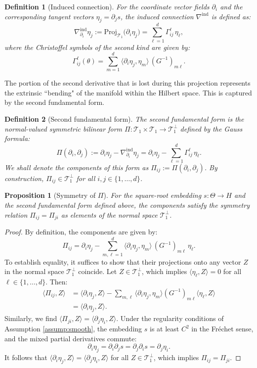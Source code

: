 \documentclass[pdflatex,sn-mathphys-num]{sn-jnl}%
\newcommand{\ip}[2]{\langle #1,#2\rangle}
\theoremstyle{thmstyleone}%
\newtheorem{proposition}[theorem]{Proposition}%
\theoremstyle{thmstyletwo}%
\theoremstyle{thmstylethree}%
\newtheorem{definition}{Definition}%
\begin{document}
\begin{definition}[Induced connection]
For the coordinate vector fields $\partial_i$ and the corresponding tangent vectors $\eta_j = \partial_j s$, the induced connection $\nabla^{\mathrm{ind}}$ is defined as:
\[
\nabla^{\mathrm{ind}}_{\partial_i}\eta_j := \mathrm{Proj}_{\mathcal{T}_1}\big(\partial_i\eta_j\big)
= \sum_{\ell=1}^d \Gamma^\ell_{ij}\,\eta_\ell,
\]
where the Christoffel symbols of the second kind are given by:
\[
\Gamma^\ell_{ij}(\theta) = \sum_{m=1}^d \ip{\partial_i\eta_j}{\eta_m}\,(G^{-1})_{m\ell}.
\]
\end{definition}


The portion of the second derivative that is lost during this projection represents the extrinsic ``bending" of the manifold within the Hilbert space. This is captured by the second fundamental form.

\begin{definition}[Second fundamental form]
The second fundamental form is the normal-valued symmetric bilinear form $\Pi: \mathcal{T}_1 \times \mathcal{T}_1 \to \mathcal{T}_1^\perp$ defined by the Gauss formula:
\[
\Pi(\partial_i,\partial_j) := \partial_i\eta_j - \nabla^{\mathrm{ind}}_{\partial_i}\eta_j = \partial_i\eta_j - \sum_{\ell=1}^d \Gamma^\ell_{ij}\,\eta_\ell.
\]
We shall denote the components of this form as $\Pi_{ij} := \Pi(\partial_i, \partial_j)$. By construction, $\Pi_{ij} \in \mathcal{T}_1^\perp$ for all $i, j \in \{1, \dots, d\}$.
\end{definition}

\begin{proposition}[Symmetry of $\Pi$]
For the square-root embedding $s:\Theta\to H$ and the second fundamental form defined above, the components satisfy the symmetry relation $\Pi_{ij} = \Pi_{ji}$ as elements of the normal space $\mathcal{T}_1^\perp$.
\end{proposition}

\begin{proof}
By definition, the components are given by:
\[
\Pi_{ij} = \partial_i\eta_j - \sum_{m,\ell=1}^d \ip{\partial_i\eta_j}{\eta_m}\,(G^{-1})_{m\ell}\,\eta_\ell.
\]
To establish equality, it suffices to show that their projections onto any vector $Z$ in the normal space $\mathcal{T}_1^\perp$ coincide. Let $Z \in \mathcal{T}_1^\perp$, which implies $\ip{\eta_\ell}{Z} = 0$ for all $\ell \in \{1, \dots, d\}$. Then:
\begin{align*}
\ip{\Pi_{ij}}{Z} &= \ip{\partial_i\eta_j}{Z} - \sum_{m,\ell} \ip{\partial_i\eta_j}{\eta_m} (G^{-1})_{m\ell} \ip{\eta_\ell}{Z} \\
&= \ip{\partial_i\eta_j}{Z}.
\end{align*}
Similarly, we find $\ip{\Pi_{ji}}{Z} = \ip{\partial_j\eta_i}{Z}$. Under the regularity conditions of Assumption \ref{assump:smooth}, the embedding $s$ is at least $C^2$ in the Fr\'echet sense, and the mixed partial derivatives commute:
\[
\partial_i\eta_j = \partial_i\partial_j s = \partial_j\partial_i s = \partial_j\eta_i.
\]
It follows that $\ip{\partial_i\eta_j}{Z} = \ip{\partial_j\eta_i}{Z}$ for all $Z \in \mathcal{T}_1^\perp$, which implies $\Pi_{ij} = \Pi_{ji}$.
\end{proof}
\end{document}
